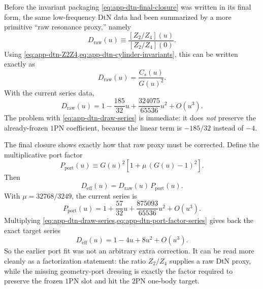 \documentclass[11pt]{article}
\newcommand{\OnePN}{\mathrm{1PN}}
\newcommand{\TwoPN}{\mathrm{2PN}}
\begin{document}
Before the invariant packaging \cref{eq:app-dtn-final-closure} was written in its final
form, the same low-frequency DtN data had been summarized by a more primitive “raw
resonance proxy,” namely
\begin{equation}
D_{\mathrm{raw}}(u)
\equiv
\frac{[Z_2/Z_4](u)}{[Z_2/Z_4](0)}.
\label{eq:app-dtn-draw-def}
\end{equation}
Using \cref{eq:app-dtn-Z2Z4,eq:app-dtn-cylinder-invariants}, this can be written exactly
as
\begin{equation}
D_{\mathrm{raw}}(u)=\frac{C_s(u)}{G(u)^2}.
\label{eq:app-dtn-draw-csg}
\end{equation}
With the current series data,
\begin{equation}
D_{\mathrm{raw}}(u)
=1-\frac{185}{32}u+\frac{324075}{65536}u^2+O(u^3).
\label{eq:app-dtn-draw-series}
\end{equation}
The problem with \cref{eq:app-dtn-draw-series} is immediate: it does \emph{not}
preserve the already-frozen \(\OnePN\) coefficient, because the linear term is
\(-185/32\) instead of \(-4\).

The final closure shows exactly how that raw proxy must be corrected.  Define the
multiplicative port factor
\begin{equation}
P_{\mathrm{port}}(u)
\equiv
G(u)^2\left[1+\mu\,(G(u)-1)^2\right].
\label{eq:app-dtn-port-factor-def}
\end{equation}
Then
\begin{equation}
D_{\mathrm{eff}}(u)=D_{\mathrm{raw}}(u)\,P_{\mathrm{port}}(u).
\label{eq:app-dtn-factorization}
\end{equation}
With \(\mu=32768/3249\), the current series is
\begin{equation}
P_{\mathrm{port}}(u)
=1+\frac{57}{32}u+\frac{875093}{65536}u^2+O(u^3).
\label{eq:app-dtn-port-factor-series}
\end{equation}
Multiplying \cref{eq:app-dtn-draw-series,eq:app-dtn-port-factor-series} gives back the
exact target series
\begin{equation}
D_{\mathrm{eff}}(u)=1-4u+8u^2+O(u^3).
\label{eq:app-dtn-factorized-target}
\end{equation}
So the earlier port fit was not an arbitrary extra correction.  It can be read more
cleanly as a factorization statement: the ratio \(Z_2/Z_4\) supplies a raw DtN proxy,
while the missing geometry-port dressing is exactly the factor required to preserve the
frozen \(\OnePN\) slot and hit the \(\TwoPN\) one-body target.
\end{document}
